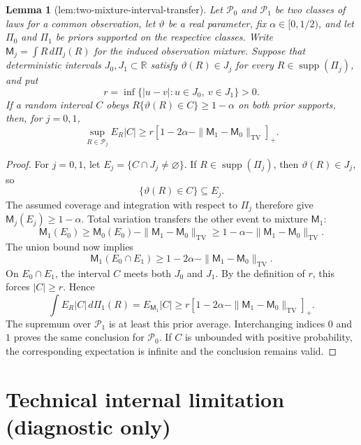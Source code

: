 \documentclass{article}
\newtheorem{lemma}{Lemma}
\begin{document}
\begin{lemma}[lem:two-mixture-interval-transfer]\label{lem:two-mixture-interval-transfer}
Let \(\mathcal P_0\) and \(\mathcal P_1\) be two classes of laws for a common observation, let \(\vartheta\) be a real parameter, fix \(\alpha\in[0,1/2)\), and let \(\Pi_0\) and \(\Pi_1\) be priors supported on the respective classes.  Write \(\mathsf M_j=\int R\,d\Pi_j(R)\) for the induced observation mixture.  Suppose that deterministic intervals \(J_0,J_1\subset\mathbb R\) satisfy \(\vartheta(R)\in J_j\) for every \(R\in\operatorname{supp}(\Pi_j)\), and put
\[
 r=\inf\{|u-v|:u\in J_0,\ v\in J_1\}>0.
\]
If a random interval \(C\) obeys \(R\{\vartheta(R)\in C\}\ge1-\alpha\) on both prior supports, then, for \(j=0,1\),
\[
 \sup_{R\in\mathcal P_j}E_R|C|
 \ge
 r\left[1-2\alpha-\|\mathsf M_1-\mathsf M_0\|_{\mathrm{TV}}\right]_+.
\]
\end{lemma}
\begin{proof}
For \(j=0,1\), let \(E_j=\{C\cap J_j\ne\varnothing\}\).  If \(R\in\operatorname{supp}(\Pi_j)\), then \(\vartheta(R)\in J_j\), so
\[
 \{\vartheta(R)\in C\}\subseteq E_j.
\]
The assumed coverage and integration with respect to \(\Pi_j\) therefore give \(\mathsf M_j(E_j)\ge1-\alpha\).  Total variation transfers the other event to mixture \(\mathsf M_1\):
\[
 \mathsf M_1(E_0)
 \ge \mathsf M_0(E_0)-\|\mathsf M_1-\mathsf M_0\|_{\mathrm{TV}}
 \ge1-\alpha-\|\mathsf M_1-\mathsf M_0\|_{\mathrm{TV}}.
\]
The union bound now implies
\[
 \mathsf M_1(E_0\cap E_1)
 \ge1-2\alpha-\|\mathsf M_1-\mathsf M_0\|_{\mathrm{TV}}.
\]
On \(E_0\cap E_1\), the interval \(C\) meets both \(J_0\) and \(J_1\).  By the definition of \(r\), this forces \(|C|\ge r\).  Hence
\[
 \int E_R|C|\,d\Pi_1(R)
 =E_{\mathsf M_1}|C|
 \ge r\left[1-2\alpha-\|\mathsf M_1-\mathsf M_0\|_{\mathrm{TV}}\right]_+.
\]
The supremum over \(\mathcal P_1\) is at least this prior average.  Interchanging indices \(0\) and \(1\) proves the same conclusion for \(\mathcal P_0\).  If \(C\) is unbounded with positive probability, the corresponding expectation is infinite and the conclusion remains valid.
\end{proof}

\section*{Technical internal limitation (diagnostic only)}
\end{document}
